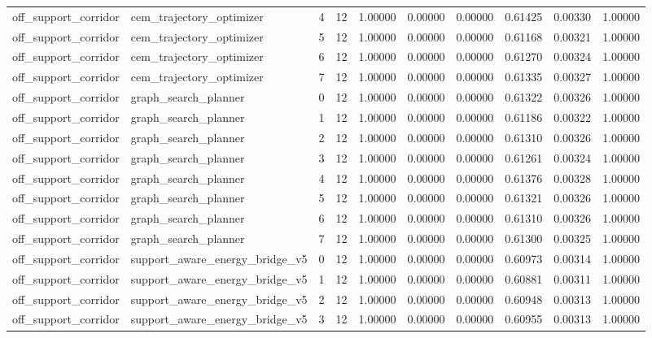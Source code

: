 \documentclass{article}
\begin{document}
\begin{table}[tbp]
{\begin{tabular}{llllllllll}
off\_support\_corridor & cem\_trajectory\_optimizer & 4 & 12 & 1.00000 & 0.00000 & 0.00000 & 0.61425 & 0.00330 & 1.00000 \\
off\_support\_corridor & cem\_trajectory\_optimizer & 5 & 12 & 1.00000 & 0.00000 & 0.00000 & 0.61168 & 0.00321 & 1.00000 \\
off\_support\_corridor & cem\_trajectory\_optimizer & 6 & 12 & 1.00000 & 0.00000 & 0.00000 & 0.61270 & 0.00324 & 1.00000 \\
off\_support\_corridor & cem\_trajectory\_optimizer & 7 & 12 & 1.00000 & 0.00000 & 0.00000 & 0.61335 & 0.00327 & 1.00000 \\
off\_support\_corridor & graph\_search\_planner & 0 & 12 & 1.00000 & 0.00000 & 0.00000 & 0.61322 & 0.00326 & 1.00000 \\
off\_support\_corridor & graph\_search\_planner & 1 & 12 & 1.00000 & 0.00000 & 0.00000 & 0.61186 & 0.00322 & 1.00000 \\
off\_support\_corridor & graph\_search\_planner & 2 & 12 & 1.00000 & 0.00000 & 0.00000 & 0.61310 & 0.00326 & 1.00000 \\
off\_support\_corridor & graph\_search\_planner & 3 & 12 & 1.00000 & 0.00000 & 0.00000 & 0.61261 & 0.00324 & 1.00000 \\
off\_support\_corridor & graph\_search\_planner & 4 & 12 & 1.00000 & 0.00000 & 0.00000 & 0.61376 & 0.00328 & 1.00000 \\
off\_support\_corridor & graph\_search\_planner & 5 & 12 & 1.00000 & 0.00000 & 0.00000 & 0.61321 & 0.00326 & 1.00000 \\
off\_support\_corridor & graph\_search\_planner & 6 & 12 & 1.00000 & 0.00000 & 0.00000 & 0.61310 & 0.00326 & 1.00000 \\
off\_support\_corridor & graph\_search\_planner & 7 & 12 & 1.00000 & 0.00000 & 0.00000 & 0.61300 & 0.00325 & 1.00000 \\
off\_support\_corridor & support\_aware\_energy\_bridge\_v5 & 0 & 12 & 1.00000 & 0.00000 & 0.00000 & 0.60973 & 0.00314 & 1.00000 \\
off\_support\_corridor & support\_aware\_energy\_bridge\_v5 & 1 & 12 & 1.00000 & 0.00000 & 0.00000 & 0.60881 & 0.00311 & 1.00000 \\
off\_support\_corridor & support\_aware\_energy\_bridge\_v5 & 2 & 12 & 1.00000 & 0.00000 & 0.00000 & 0.60948 & 0.00313 & 1.00000 \\
off\_support\_corridor & support\_aware\_energy\_bridge\_v5 & 3 & 12 & 1.00000 & 0.00000 & 0.00000 & 0.60955 & 0.00313 & 1.00000 \\

\end{tabular}}
\end{table}
\end{document}
